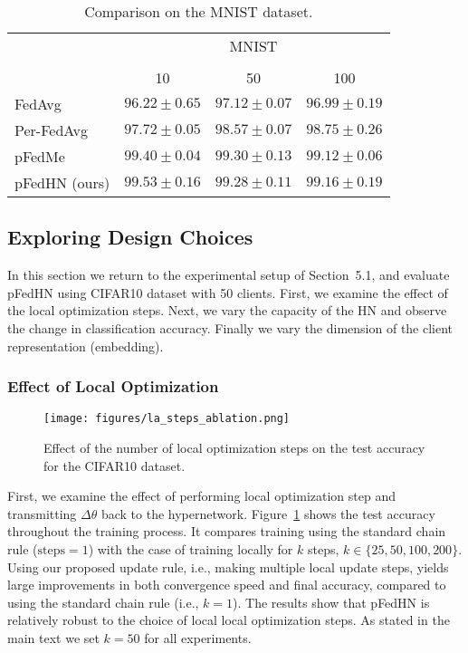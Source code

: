 \documentclass{article}
\newcommand\ourmethod{pFedHN}
\begin{document}
\begin{table}[th]
    \vskip 0.15in
\tiny
    \centering
    \caption{Comparison on the MNIST dataset.}
    \begin{tabular}{l c c c }
    \toprule
    & \multicolumn{3}{c}{MNIST}\\
     \cmidrule{2-4}\\
     & 10  & 50 & 100\\
    \midrule
    FedAvg & $96.22\pm 0.65$ & $97.12\pm 0.07$ & $96.99\pm 0.19$\\
    Per-FedAvg & $97.72\pm 0.05$ & $98.57\pm 0.07$ & $98.75\pm 0.26$\\
    pFedMe & $99.40 \pm 0.04$ & $99.30 \pm 0.13$ & $99.12\pm 0.06$\\
    \midrule
    \ourmethod{} (ours) & $99.53 \pm 0.16$ & $99.28 \pm 0.11$ & $99.16 \pm 0.19$\\
    \bottomrule
    \end{tabular}
    \label{tab:mnist_hetro}
\end{table}


\subsection{Exploring Design Choices}


In this section we return to the experimental setup of Section~5.1, 
and evaluate \ourmethod{} using CIFAR10 dataset with 50 clients. First, we examine the effect of the local optimization steps. Next, we vary the capacity of the HN and observe the change in classification accuracy. Finally we vary the dimension of the client representation (embedding).

\subsubsection{Effect of Local Optimization}

\begin{figure}[h]
    \centering
    \texttt{[image: figures/la\_steps\_ablation.png]}
    \caption{Effect of the number of local optimization steps on the test accuracy for the CIFAR10 dataset.}
    \label{fig:local_opt}
\end{figure}

First, we examine the effect of performing local optimization step and transmitting $\Delta\theta$ back to the hypernetwork. Figure~\ref{fig:local_opt} shows the test accuracy throughout the training process. 
It compares training using the standard chain rule ($\text{steps}=1$) with the case of training locally for $k$ steps, $k\in\{25,50,100,200\}$.
Using our proposed update rule, i.e., making multiple local update steps, yields large improvements in both convergence speed and final accuracy, compared to using the standard chain rule (i.e., $k=1$). The results show that \ourmethod{} is relatively robust to the choice of local local optimization steps. As stated in the main text we set $k=50$ for all experiments.
\end{document}

